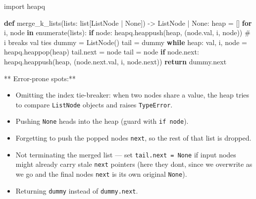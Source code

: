 \documentclass[11pt]{article}
\providecommand{\tightlist}{\setlength{\itemsep}{1pt}\setlength{\parskip}{0pt}}
\newenvironment{Shaded}{\begin{snugshade}}{\end{snugshade}}
\newcommand{\BuiltInTok}[1]{\textcolor[rgb]{0.50,0.55,0.55}{#1}}
\newcommand{\CommentTok}[1]{\textcolor[rgb]{0.48,0.49,0.49}{#1}}
\newcommand{\ControlFlowTok}[1]{\textcolor[rgb]{0.99,0.74,0.29}{\textbf{#1}}}
\newcommand{\ImportTok}[1]{\textcolor[rgb]{0.15,0.68,0.38}{#1}}
\newcommand{\KeywordTok}[1]{\textcolor[rgb]{0.81,0.81,0.76}{\textbf{#1}}}
\newcommand{\NormalTok}[1]{\textcolor[rgb]{0.81,0.81,0.76}{#1}}
\newcommand{\OperatorTok}[1]{\textcolor[rgb]{0.81,0.81,0.76}{#1}}
\newcommand{\VariableTok}[1]{\textcolor[rgb]{0.15,0.68,0.68}{#1}}
\begin{document}
\begin{Shaded}
\begin{Highlighting}[]
\ImportTok{import}\NormalTok{ heapq}

\KeywordTok{def}\NormalTok{ merge\_k\_lists(lists: }\BuiltInTok{list}\NormalTok{[ListNode }\OperatorTok{|} \VariableTok{None}\NormalTok{]) }\OperatorTok{{-}\textgreater{}}\NormalTok{ ListNode }\OperatorTok{|} \VariableTok{None}\NormalTok{:}
\NormalTok{    heap }\OperatorTok{=}\NormalTok{ []}
    \ControlFlowTok{for}\NormalTok{ i, node }\KeywordTok{in} \BuiltInTok{enumerate}\NormalTok{(lists):}
        \ControlFlowTok{if}\NormalTok{ node:}
\NormalTok{            heapq.heappush(heap, (node.val, i, node))  }\CommentTok{\# i breaks val ties}
\NormalTok{    dummy }\OperatorTok{=}\NormalTok{ ListNode()}
\NormalTok{    tail }\OperatorTok{=}\NormalTok{ dummy}
    \ControlFlowTok{while}\NormalTok{ heap:}
\NormalTok{        val, i, node }\OperatorTok{=}\NormalTok{ heapq.heappop(heap)}
\NormalTok{        tail.}\BuiltInTok{next} \OperatorTok{=}\NormalTok{ node}
\NormalTok{        tail }\OperatorTok{=}\NormalTok{ node}
        \ControlFlowTok{if}\NormalTok{ node.}\BuiltInTok{next}\NormalTok{:}
\NormalTok{            heapq.heappush(heap, (node.}\BuiltInTok{next}\NormalTok{.val, i, node.}\BuiltInTok{next}\NormalTok{))}
    \ControlFlowTok{return}\NormalTok{ dummy.}\BuiltInTok{next}
\end{Highlighting}
\end{Shaded}

** Error-prone spots:**

\begin{itemize}
\tightlist
\item
  Omitting the index tie-breaker: when two nodes share a value, the heap tries to compare \texttt{ListNode} objects and raises \texttt{TypeError}.
\item
  Pushing \texttt{None} heads into the heap (guard with \texttt{if\ node}).
\item
  Forgetting to push the popped node\textquotesingle s \texttt{next}, so the rest of that list is dropped.
\item
  Not terminating the merged list --- set \texttt{tail.next\ =\ None} if input nodes might already carry stale \texttt{next} pointers (here they don\textquotesingle t, since we overwrite as we go and the final node\textquotesingle s \texttt{next} is its own original \texttt{None}).
\item
  Returning \texttt{dummy} instead of \texttt{dummy.next}.
\end{itemize}
\end{document}
